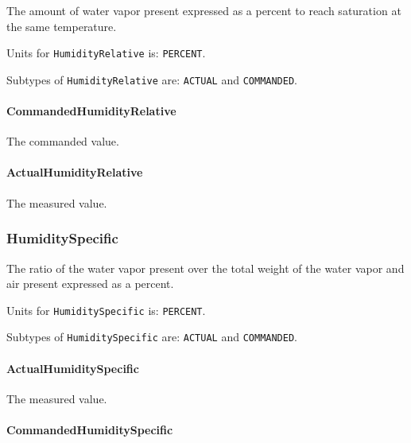 The amount of water vapor present expressed as a percent to reach saturation at the same temperature.


Units for \texttt{HumidityRelative} is: \texttt{PERCENT}.


Subtypes of \texttt{HumidityRelative} are: \texttt{ACTUAL} and \texttt{COMMANDED}. 
\FloatBarrier

\paragraph{CommandedHumidityRelative}\mbox{}
\label{sec:CommandedHumidityRelative}



The commanded value.


\paragraph{ActualHumidityRelative}\mbox{}
\label{sec:ActualHumidityRelative}



The measured value.


\subsubsection{HumiditySpecific}
\label{sec:HumiditySpecific}



The ratio of the water vapor present over the total weight of the water vapor and air present expressed as a percent.



Units for \texttt{HumiditySpecific} is: \texttt{PERCENT}.


Subtypes of \texttt{HumiditySpecific} are: \texttt{ACTUAL} and \texttt{COMMANDED}. 
\FloatBarrier

\paragraph{ActualHumiditySpecific}\mbox{}
\label{sec:ActualHumiditySpecific}



The measured value.


\paragraph{CommandedHumiditySpecific}\mbox{}
\label{sec:CommandedHumiditySpecific}



